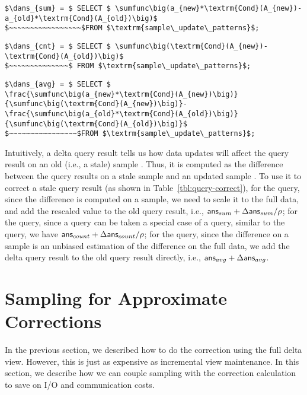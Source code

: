 \fussy

\begin{lstlisting}[mathescape,basicstyle={\scriptsize}]
$\dans_{sum} = $ SELECT $ \sumfunc\big(a_{new}*\textrm{Cond}(A_{new})-a_{old}*\textrm{Cond}(A_{old})\big)$ 
$~~~~~~~~~~~~~~~~~$FROM $\textrm{sample\_update\_patterns}$;
\end{lstlisting}

\begin{lstlisting}[mathescape,basicstyle={\scriptsize}]
$\dans_{cnt} = $ SELECT $ \sumfunc\big(\textrm{Cond}(A_{new})-\textrm{Cond}(A_{old})\big)$ 
$~~~~~~~~~~~~~~$ FROM $\textrm{sample\_update\_patterns}$;
\end{lstlisting}


\begin{lstlisting}[mathescape,basicstyle={\scriptsize}]
$\dans_{avg} = $ SELECT $
\frac{\sumfunc\big(a_{new}*\textrm{Cond}(A_{new})\big)}{\sumfunc\big(\textrm{Cond}(A_{new})\big)}- \frac{\sumfunc\big(a_{old}*\textrm{Cond}(A_{old})\big)}{\sumfunc\big(\textrm{Cond}(A_{old})\big)}$ 
$~~~~~~~~~~~~~~~~$FROM $\textrm{sample\_update\_patterns}$;
\end{lstlisting}

Intuitively, a delta query result tells us how data updates will affect the query result on an old (i.e., a stale) sample \aggview. Thus, it is computed as the difference between the query results on a stale sample \aggview and an updated sample \aggview. To use it to correct a stale query result (as shown in Table~\ref{tbl:query-correct}), for the \sumfunc query, since the \sumfunc difference is computed on a sample, we need to scale it to the full data, and add the rescaled value to the old query result, i.e., $\textsf{ans}_{sum}+\Delta\textsf{ans}_{sum}/\rho $; for the \countfunc query, since a \countfunc query can be taken a special case of a \sumfunc query, similar to the \sumfunc query, we have $\textsf{ans}_{count}+\Delta\textsf{ans}_{count}/\rho $; for the \avgfunc query, since the \avgfunc difference on a sample is an unbiased estimation of the \avgfunc difference on the full data, we add the delta query result to the old query result directly, i.e., $\textsf{ans}_{avg}+\Delta\textsf{ans}_{avg}$.





\iffalse
\section{Sampling for Approximate Corrections}
In the previous section, we described how to do the correction using the full delta view.
However, this is just as expensive as incremental view maintenance.
In this section, we describe how we can couple sampling with the correction calculation to
save on I/O and communication costs. 

